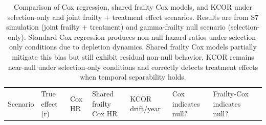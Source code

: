 \documentclass[
]{article}
\begin{document}
\newpage

\begin{longtable}[]{@{}
  >{\raggedright\arraybackslash}p{}
  >{\raggedright\arraybackslash}p{}
  >{\raggedright\arraybackslash}p{}
  >{\raggedright\arraybackslash}p{}
  >{\raggedright\arraybackslash}p{}
  >{\raggedright\arraybackslash}p{}
  >{\raggedright\arraybackslash}p{}
  >{\raggedright\arraybackslash}p{}@{}}
\caption{Comparison of Cox regression, shared frailty Cox models, and
KCOR under selection-only and joint frailty + treatment effect
scenarios. Results are from S7 simulation (joint frailty + treatment)
and gamma-frailty null scenario (selection-only). Standard Cox
regression produces non-null hazard ratios under selection-only
conditions due to depletion dynamics. Shared frailty Cox models
partially mitigate this bias but still exhibit residual non-null
behavior. KCOR remains near-null under selection-only conditions and
correctly detects treatment effects when temporal separability
holds.}\label{tbl:joint_frailty_comparison}\tabularnewline
\toprule\noalign{}
\begin{minipage}[b]{\linewidth}\raggedright
Scenario
\end{minipage} & \begin{minipage}[b]{\linewidth}\raggedright
True effect (r)
\end{minipage} & \begin{minipage}[b]{\linewidth}\raggedright
Cox HR
\end{minipage} & \begin{minipage}[b]{\linewidth}\raggedright
Shared frailty Cox HR
\end{minipage} & \begin{minipage}[b]{\linewidth}\raggedright
KCOR drift/year
\end{minipage} & \begin{minipage}[b]{\linewidth}\raggedright
Cox indicates null?
\end{minipage} & \begin{minipage}[b]{\linewidth}\raggedright
Frailty-Cox indicates null?
\end{minipage} & \begin{minipage}[b]{\linewidth}\raggedright

\end{minipage}
\end{longtable}
\end{document}
